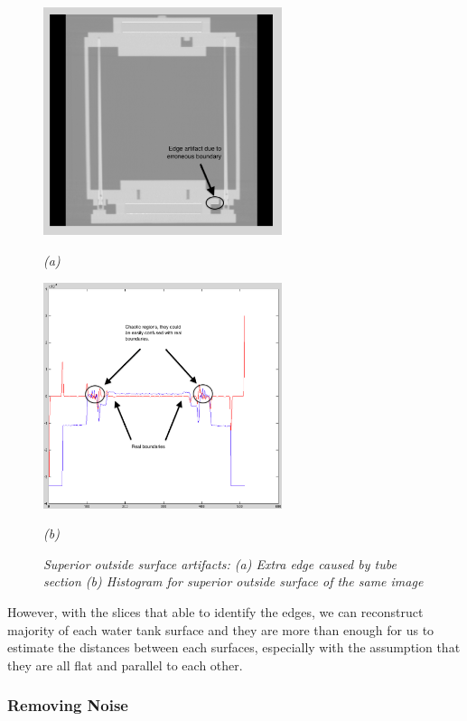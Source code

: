\begin{figure}[htb]
  \begin{minipage}[b]{2.75in}
    \centering
    \centerline{\mbox{\includegraphics[width=2.75in]{data_extraction/images/sample/20121017_125/Coronal/Superior_outside/extra_edge.eps}}}
    \centerline{\emph{(a)}}
  \end{minipage}
  \begin{minipage}[b]{2.75in}
    \centering
    \centerline{\mbox{\includegraphics[width=2.75in]{data_extraction/images/sample/20121017_125/Coronal/Superior_outside/extra_edge_histogram.eps}}}
    \centerline{\emph{(b)}}
  \end{minipage}
  \caption{\emph{Superior outside surface artifacts: (a) Extra edge caused by tube section (b) Histogram for superior outside surface of the same image}}
  \label{fig:superior_outside_artifacts}
\end{figure}

However, with the slices that able to identify the edges,
we can reconstruct majority of each water tank surface and they are more than enough for us to estimate the
distances between each surfaces, especially with the assumption that they are all flat and parallel to each
other.

\subsubsection{Removing Noise}

